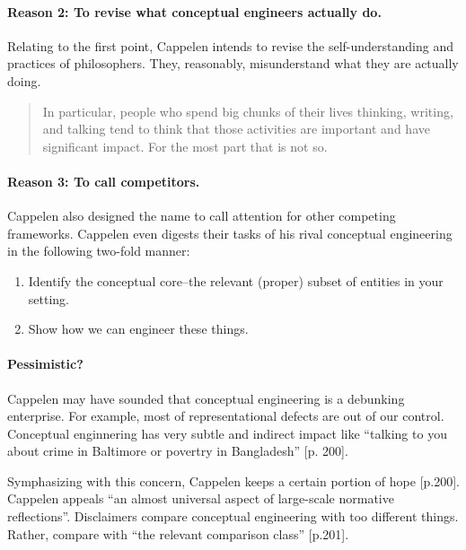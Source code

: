 \documentclass[
10pt, %
a4paper, %
twocolumn, %
landscape %
]{article}
\begin{document}
\paragraph{Reason 2: To revise what conceptual engineers actually do. }
Relating to the first point,
Cappelen intends to revise the self-understanding and practices of philosophers.
They, reasonably, misunderstand what they are actually doing.

\begin{quote}
  In particular, people who spend big chunks of their lives thinking, writing, and talking tend to think that those activities are important and have significant impact. For the most part that is not so.
\end{quote}

\paragraph{Reason 3: To call competitors.}
Cappelen also designed the name to call attention for other competing frameworks.
Cappelen even digests their tasks of his rival conceptual engineering in the following two-fold manner:

\begin{enumerate}
  \item Identify the conceptual core--the relevant (proper) subset of entities in your setting.
  \item Show how we can engineer these things.
\end{enumerate}

\paragraph{Pessimistic?}
Cappelen may have sounded that conceptual engineering is a debunking enterprise.
For example, most of representational defects are out of our control.
Conceptual enginnering has very subtle and indirect impact like ``talking to you about crime in Baltimore or povertry in Bangladesh'' [p. 200].

Symphasizing with this concern, Cappelen keeps a certain portion of hope [p.200].
Cappelen appeals ``an almost universal aspect of large-scale normative reflections''.
Disclaimers compare conceptual engineering with too different things. Rather, compare with ``the relevant comparison class'' [p.201].
\end{document}
